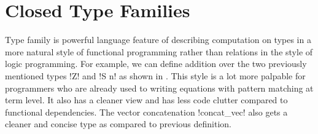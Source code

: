 \documentclass[format=sigplan,manuscript,review,screen,nonacm,margin=1in]{acmart}
\begin{document}

\section{Closed Type Families}\label{sec:tf-closed}
Type family is powerful language feature of describing computation on types in a more
natural style of functional programming rather than relations in the style of logic programming.
For example, we can define addition over the two previously mentioned types !Z! and !S n!
as shown in . This style is a lot more palpable for programmers
who are already used to writing equations with pattern matching at term level.
It also has a cleaner view and has less code clutter compared to functional dependencies.
The vector concatenation !concat_vec! also gets a cleaner and concise type as compared to previous definition.
\end{document}
